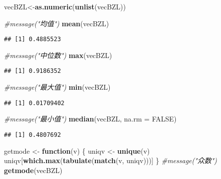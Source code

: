 \documentclass[]{article}
\newenvironment{Shaded}{\begin{snugshade}}{\end{snugshade}}
\newcommand{\KeywordTok}[1]{\textcolor[rgb]{0.13,0.29,0.53}{\textbf{#1}}}
\newcommand{\DataTypeTok}[1]{\textcolor[rgb]{0.13,0.29,0.53}{#1}}
\newcommand{\StringTok}[1]{\textcolor[rgb]{0.31,0.60,0.02}{#1}}
\newcommand{\CommentTok}[1]{\textcolor[rgb]{0.56,0.35,0.01}{\textit{#1}}}
\newcommand{\OtherTok}[1]{\textcolor[rgb]{0.56,0.35,0.01}{#1}}
\newcommand{\ControlFlowTok}[1]{\textcolor[rgb]{0.13,0.29,0.53}{\textbf{#1}}}
\newcommand{\NormalTok}[1]{#1}
\begin{document}
\begin{Shaded}
\begin{Highlighting}[]
\NormalTok{vecBZL<-}\KeywordTok{as.numeric}\NormalTok{(}\KeywordTok{unlist}\NormalTok{(vecBZL))}
\end{Highlighting}
\end{Shaded}

\begin{Shaded}
\begin{Highlighting}[]
\CommentTok{#message("均值")}
\KeywordTok{mean}\NormalTok{(vecBZL)}
\end{Highlighting}
\end{Shaded}

\begin{verbatim}
## [1] 0.4885523
\end{verbatim}

\begin{Shaded}
\begin{Highlighting}[]
\CommentTok{#message("中位数")}
\KeywordTok{max}\NormalTok{(vecBZL)}
\end{Highlighting}
\end{Shaded}

\begin{verbatim}
## [1] 0.9186352
\end{verbatim}

\begin{Shaded}
\begin{Highlighting}[]
\CommentTok{#message("最大值")}
\KeywordTok{min}\NormalTok{(vecBZL)}
\end{Highlighting}
\end{Shaded}

\begin{verbatim}
## [1] 0.01709402
\end{verbatim}

\begin{Shaded}
\begin{Highlighting}[]
\CommentTok{#message("最小值")}
\KeywordTok{median}\NormalTok{(vecBZL, }\DataTypeTok{na.rm =} \OtherTok{FALSE}\NormalTok{)}
\end{Highlighting}
\end{Shaded}

\begin{verbatim}
## [1] 0.4807692
\end{verbatim}

\begin{Shaded}
\begin{Highlighting}[]
\NormalTok{getmode <-}\StringTok{ }\ControlFlowTok{function}\NormalTok{(v) \{}
\NormalTok{  uniqv <-}\StringTok{ }\KeywordTok{unique}\NormalTok{(v)}
\NormalTok{  uniqv[}\KeywordTok{which.max}\NormalTok{(}\KeywordTok{tabulate}\NormalTok{(}\KeywordTok{match}\NormalTok{(v, uniqv)))]}
\NormalTok{\}}
\CommentTok{#message("众数")}
\KeywordTok{getmode}\NormalTok{(vecBZL)}
\end{Highlighting}
\end{Shaded}
\end{document}
